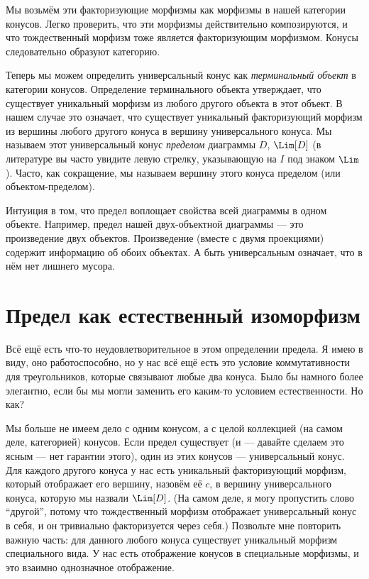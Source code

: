 \noindent
Мы возьмём эти факторизующие морфизмы как морфизмы в нашей категории
конусов. Легко проверить, что эти морфизмы действительно композируются, и
что тождественный морфизм тоже является факторизующим морфизмом. Конусы
следовательно образуют категорию.

Теперь мы можем определить универсальный конус как \emph{терминальный объект} в
категории конусов. Определение терминального объекта утверждает, что
существует уникальный морфизм из любого другого объекта в этот объект. В нашем
случае это означает, что существует уникальный факторизующий морфизм из вершины
любого другого конуса в вершину универсального конуса. Мы называем этот
универсальный конус \emph{пределом} диаграммы $D$, $\Lim[D]$ (в
литературе вы часто увидите левую стрелку, указывающую на $I$
под знаком $\Lim$). Часто, как сокращение, мы называем вершину
этого конуса пределом (или объектом-пределом).

Интуиция в том, что предел воплощает свойства всей
диаграммы в одном объекте. Например, предел нашей двух-объектной
диаграммы --- это произведение двух объектов. Произведение (вместе с
двумя проекциями) содержит информацию об обоих объектах. А быть
универсальным означает, что в нём нет лишнего мусора.

\section{Предел как естественный изоморфизм}

Всё ещё есть что-то неудовлетворительное в этом определении предела.
Я имею в виду, оно работоспособно, но у нас всё ещё есть это условие коммутативности
для треугольников, которые связывают любые два конуса. Было бы намного
более элегантно, если бы мы могли заменить его каким-то условием естественности. Но
как?

Мы больше не имеем дело с одним конусом, а с целой коллекцией (на
самом деле, категорией) конусов. Если предел существует (и --- давайте сделаем это
ясным --- нет гарантии этого), один из этих конусов --- универсальный
конус. Для каждого другого конуса у нас есть уникальный факторизующий
морфизм, который отображает его вершину, назовём её $c$, в вершину
универсального конуса, которую мы назвали $\Lim[D]$. (На самом деле, я могу пропустить
слово ``другой'', потому что тождественный морфизм отображает универсальный
конус в себя, и он тривиально факторизуется через себя.) Позвольте мне
повторить важную часть: для данного любого конуса существует уникальный морфизм
специального вида. У нас есть отображение конусов в специальные морфизмы, и
это взаимно однозначное отображение.

